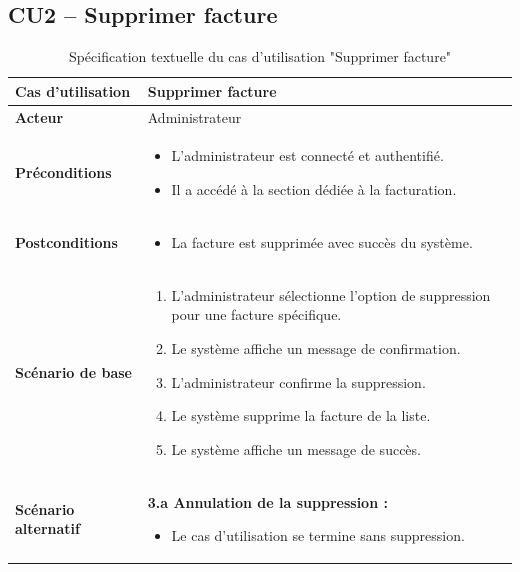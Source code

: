 \documentclass[a4paper,11pt]{report}
\begin{document}
\subsection*{CU2 – Supprimer facture}
\begin{table}[H]
  \centering
  \renewcommand{\arraystretch}{1.5}
  \caption{Spécification textuelle du cas d'utilisation "Supprimer facture"}
  \begin{tabularx}{\textwidth}{|l|X|}
    \hline
    \textbf{Cas d'utilisation} & Supprimer facture \\ \hline
    \textbf{Acteur}            & Administrateur \\ \hline
    \textbf{Préconditions}     & 
      \begin{itemize}
        \item L’administrateur est connecté et authentifié.
        \item Il a accédé à la section dédiée à la facturation.
      \end{itemize} \\ \hline
    \textbf{Postconditions}    & 
      \begin{itemize}
        \item La facture est supprimée avec succès du système.
      \end{itemize} \\ \hline
    \textbf{Scénario de base}  & 
      \begin{enumerate}
        \item L’administrateur sélectionne l’option de suppression pour une facture spécifique.
        \item Le système affiche un message de confirmation.
        \item L’administrateur confirme la suppression.
        \item Le système supprime la facture de la liste.
        \item Le système affiche un message de succès.
      \end{enumerate} \\ \hline
    \textbf{Scénario alternatif} & 
      \textbf{3.a Annulation de la suppression :}
      \begin{itemize}
        \item Le cas d'utilisation se termine sans suppression.
      \end{itemize} \\ \hline
  \end{tabularx}
\end{table}
\end{document}
